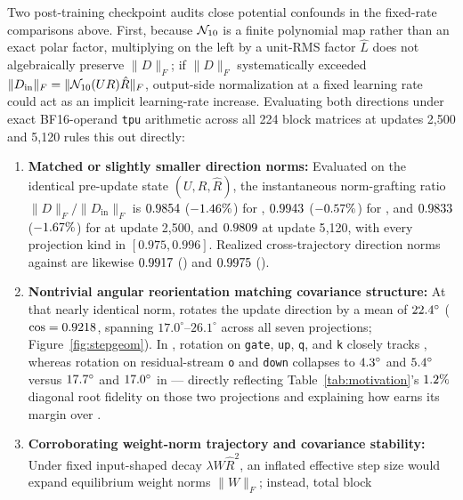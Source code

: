 Two post-training checkpoint audits close potential confounds in the fixed-rate
comparisons above. First, because $\mathcal{N}_{10}$ is a finite polynomial map rather than
an exact polar factor, multiplying on the left by a unit-RMS factor $\hat L$
does not algebraically preserve $\|D\|_F$; if $\|D\|_F$ systematically exceeded
$\|D_{\text{in}}\|_F = \|\mathcal{N}_{10}(UR)\hat R\|_F$, output-side normalization at a
fixed learning rate could act as an implicit learning-rate increase. Evaluating
both directions under exact BF16-operand \texttt{tpu} arithmetic across all 224
block matrices at updates 2{,}500 and 5{,}120 rules this out directly:
\begin{enumerate}
\item \textbf{Matched or slightly smaller direction norms:} Evaluated on the
  identical pre-update state $(U,R,\hat R)$, the instantaneous norm-grafting
  ratio $\|D\|_F / \|D_{\text{in}}\|_F$ is $0.9854$
  ($-1.46\%$) for \mlpdiag{}, $0.9943$
  ($-0.57\%$) for \alldiag{}, and $0.9833$
  ($-1.67\%$) for \dense{} at update 2{,}500, and
  $0.9809$ at update 5{,}120, with every projection kind in
  $[0.975, 0.996]$. Realized cross-trajectory direction norms against \muont{}
  are likewise $0.9917$ (\mlpdiag{}) and
  $0.9975$ (\alldiag{}).
\item \textbf{Nontrivial angular reorientation matching covariance structure:}
  At that nearly identical norm, \mlpdiag{} rotates the update direction by a
  mean of $22.4^\circ$ ($\cos = 0.9218$, spanning
  $17.0^\circ$--$26.1^\circ$ across all seven projections; Figure~\ref{fig:stepgeom}).
  In \alldiag{}, rotation on \texttt{gate}, \texttt{up}, \texttt{q}, and
  \texttt{k} closely tracks \mlpdiag{}, whereas rotation on residual-stream
  \texttt{o} and \texttt{down} collapses to $4.3^\circ$ and
  $5.4^\circ$ versus $17.7^\circ$ and
  $17.0^\circ$ in \mlpdiag{} --- directly reflecting
  Table~\ref{tab:motivation}'s $1.2\%$ diagonal root fidelity
  on those two projections and explaining how \mlpdiag{} earns its margin over
  \alldiag{}.
\item \textbf{Corroborating weight-norm trajectory and covariance stability:}
  Under fixed input-shaped decay $\lambda W\hat R^2$, an inflated effective step
  size would expand equilibrium weight norms $\|W\|_F$; instead, total block

\end{enumerate}
